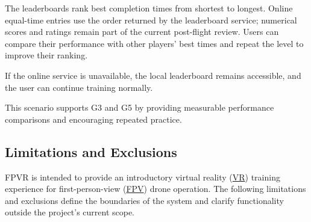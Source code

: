 \documentclass[12pt]{article}
\begin{document}
The leaderboards rank best completion times from shortest to longest.
Online equal-time entries use the order returned by the leaderboard service;
numerical scores and ratings remain part of the current post-flight review.
Users can compare their performance with
other players' best times and repeat the level
to improve their ranking.

If the online service is unavailable, the
local leaderboard remains accessible, and
the user can continue training normally.

This scenario supports G3 and G5 by providing
measurable performance comparisons and
encouraging repeated practice.


\subsection{Limitations and Exclusions}\label{g6}

FPVR is intended to provide an introductory virtual reality
(\hyperlink{glos:VR}{VR}) training experience for first-person-view (\hyperlink{glos:FPV}{FPV}) drone
operation. The following limitations and exclusions define
the boundaries of the system and clarify functionality
outside the project's current scope.
\end{document}
